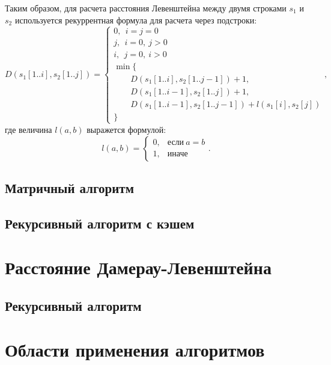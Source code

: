 Таким образом, для расчета расстояния Левенштейна между двумя строками $s_1$ и $s_2$ используется рекуррентная формула для расчета через подстроки:
\begin{equation}
D(s_1[1..i],s_2[1..j]) =
    \begin{cases}
        0,~~i=j=0\\
        j,~~i=0,~j>0\\
        i,~~j=0,~i>0\\
        \min \{\\
         \qquad D(s_1[1..i],s_2[1..j-1]) + 1,\\
         \qquad D(s_1[1..i-1],s_2[1..j]) + 1,\\
         \qquad D(s_1[1..i-1],s_2[1..j-1]) + l(s_1[i], s_2[j])\\
        \}
    \end{cases},
\end{equation}
где величина $l(a, b)$ выражется формулой:
\begin{equation}
l(a, b) =
    \begin{cases}
        0, & \text{если}~a = b\\
        1, & \text{иначе}
    \end{cases}.
\end{equation}



\subsection{Матричный алгоритм}

\subsection{Рекурсивный алгоритм с кэшем}

\section{Расстояние Дамерау-Левенштейна}

\subsection{Рекурсивный алгоритм}

\section{Области применения алгоритмов}


